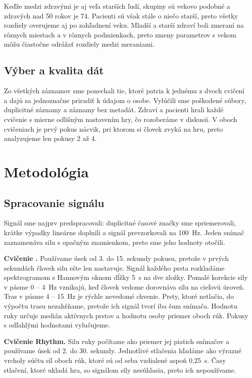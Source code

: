 \documentclass[12pt,a4paper]{article}
\begin{document}
Keďže medzi zdravými je aj veľa starších ľudí, skupiny sú vekovo podobné a zdravých nad 50 rokov je 74. Pacienti sú však
stále o niečo starší, preto všetky rozdiely overujeme aj po zohľadnení veku. Mladší a starší zdraví boli zmeraní
na rôznych miestach a v rôznych podmienkach, preto zmeny parametrov s vekom môžu čiastočne odrážať rozdiely
medzi meraniami.

\subsection{Výber a kvalita dát}

Zo všetkých záznamov sme ponechali tie, ktoré patria k jednému z dvoch cvičení a dajú sa jednoznačne priradiť k údajom
o osobe. Vylúčili sme poškodené súbory, duplicitné záznamy a záznamy bez metadát. Zdraví a pacienti hrali každé cvičenie s mierne
odlišným nastavením hry, čo rozoberáme v diskusii. V oboch cvičeniach je prvý pokus nácvik, pri ktorom si
človek zvyká na hru, preto analyzujeme len pokusy 2 až 4.

\section{Metodológia}
\label{sec:metodika}

\subsection{Spracovanie signálu}

Signál sme najprv predspracovali: duplicitné časové značky sme spriemerovali, krátke výpadky lineárne doplnili
a signál prevzorkovali na 100~Hz. Jeden snímač zaznamenáva silu s opačným znamienkom,
preto sme jeho hodnoty otočili.

\textbf{Cvičenie \ef{}.} Používame úsek od 3. do 15. sekundy pokusu, pretože v prvých sekundách človek silu ešte len
nastavuje. Signál každého prsta rozkladáme spektrogramom s Hannovým oknom dĺžky 5~s na dve zložky. Pomalé korekcie
sily v pásme 0 -- 4~Hz vznikajú, keď človek vedome dorovnáva silu na cieľovú úroveň. Tras v pásme 4 -- 15~Hz je rýchle
nevedomé chvenie. Prsty, ktoré netlačia, do výpočtu trasu nezahŕňame, pretože ich signál tvorí iba šum snímača.
Hodnotu ruky určuje medián aktívnych prstov a hodnotu osoby priemer oboch rúk. Pokusy s odľahlými hodnotami
vylučujeme.

\textbf{Cvičenie Rhythm.} Silu ruky počítame ako priemer jej piatich snímačov a používame úsek od 2. do 30. sekundy.
Jednotlivé stlačenia hľadáme ako výrazné vrcholy súčtu síl oboch rúk, ktoré sú od seba vzdialené aspoň 0,25~s.
Časy stlačení, ktoré ukladá hra, so signálom sily nesúhlasia, preto ich nepoužívame.
\end{document}
